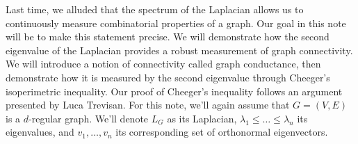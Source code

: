 
Last time, we alluded that the spectrum of the Laplacian allows us to continuously measure combinatorial properties of a graph. Our goal in this note will be to make this statement precise. We will demonstrate how the second eigenvalue of the Laplacian provides a robust measurement of graph connectivity. We will introduce a notion of connectivity called graph conductance, then demonstrate how it is measured by the second eigenvalue through Cheeger's isoperimetric inequality. Our proof of Cheeger's inequality follows an argument presented by Luca Trevisan. For this note, we'll again assume that $G = (V, E)$ is a $d$-regular graph. We'll denote $L_G$ as its Laplacian, $\lambda_1 \leq \ldots \leq \lambda_n$ its eigenvalues, and $v_1, \ldots, v_n$ its corresponding set of orthonormal eigenvectors.
